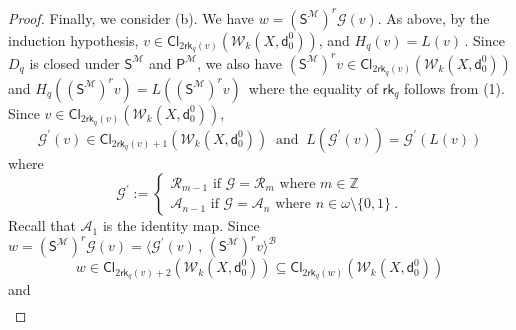 \documentclass[10pt,a4paper, openany,  oldfontcommands]{memoir}
\newtheorem{open problem} [theorem] {Open Problem}
\newtheorem{open question} [theorem] {Open Question}
\renewcommand{\mathrm}{\mathsf}
\begin{document}
\begin{proof}
Finally, we consider (b). 
We have  $    w  =   \left(  \mathrm{S}^{  \mathcal{M}  }  \right)^r    \mathcal{G}  \left(     v  \right)   $. 
As above,  by the induction hypothesis,  
$  v   \in    \mathsf{Cl}_{   2  \mathsf{rk}_q  \left(  v   \right) }  \left(    \mathcal{W}_k  \left( X    ,  \mathsf{d}^0_0   \right)    \right)   $,  
and    $  H_q  (v)  =  L(v)     \,  $. 
  Since  $  D_q $  is closed under    $   \mathrm{S}^{  \mathcal{M}  }  $  and   $  \mathrm{P}^{  \mathcal{M}  } $, 
  we also have  
 $    \left(  \mathrm{S}^{  \mathcal{M}  }  \right)^r  v   \in    
 \mathsf{Cl}_{   2  \mathsf{rk}_q  \left(  v   \right) }  \left(    \mathcal{W}_k  \left( X   ,  \mathsf{d}^0_0  \right)    \right)   $  
  and  $  H_q  \left(   \left(  \mathrm{S}^{  \mathcal{M}  }  \right)^r  v   \right)  = 
  L \left(   \left(  \mathrm{S}^{  \mathcal{M}  }  \right)^r  v   \right)    \,   $
  where the equality of $  \mathsf{rk}_q  $ follows from (1). 
  Since $  v  \in     \mathsf{Cl}_{   2  \mathsf{rk}_q  \left(  v   \right) }  \left(    \mathcal{W}_k  \left( X   ,  \mathsf{d}^0_0  \right)    \right)   $, 
  \[
  \mathcal{G}^{  \prime }  \left(  v  \right)   \in  
    \mathsf{Cl}_{   2  \mathsf{rk}_q  \left(  v   \right) +1  }  \left(    \mathcal{W}_k  \left( X    ,  \mathsf{d}^0_0   \right)    \right)
  \    \mbox{  and  }    \  
  L  \left(      \mathcal{G}^{  \prime }  \left(  v  \right)      \right)  =     \mathcal{G}^{  \prime }  \left(   L(v)  \right)   
  \]
  where  
\[
\mathcal{G}^{  \prime  }  :=   \begin{cases}
\mathcal{R}_{ m-1}      \mbox{  if  }     \mathcal{G} =  \mathcal{R}_m   \mbox{  where  }  m  \in  \mathbb{Z}
\\
\mathcal{A}_{ n-1}      \mbox{  if  }     \mathcal{G} =  \mathcal{A}_n   \mbox{  where  }  n  \in  \omega \setminus  \lbrace 0, 1  \rbrace 
\      .
\end{cases}
\]
Recall that  $  \mathcal{A}_1 $  is the identity map. 
Since   
 $   w  =    \left(  \mathrm{S}^{  \mathcal{M}  }  \right)^r       \mathcal{G} \left(  v  \right)   
  =  \langle      \mathcal{G}^{  \prime }  \left(  v  \right)    \,  ,  \, 
  \left(  \mathrm{S}^{  \mathcal{M}  }  \right)^r   v  \rangle^{  \mathcal{B}  }  $
\[
w  \in     \mathsf{Cl}_{   2  \mathsf{rk}_q  \left(  v   \right) + 2 }  \left(    \mathcal{W}_k  \left( X    ,  \mathsf{d}^0_0   \right)    \right)
\subseteq    
 \mathsf{Cl}_{   2  \mathsf{rk}_q  \left(  w   \right)  }  \left(    \mathcal{W}_k  \left( X    ,  \mathsf{d}^0_0    \right)    \right)
\]
and  
\begin{align*}

\end{align*}
\end{proof}
\end{document}
